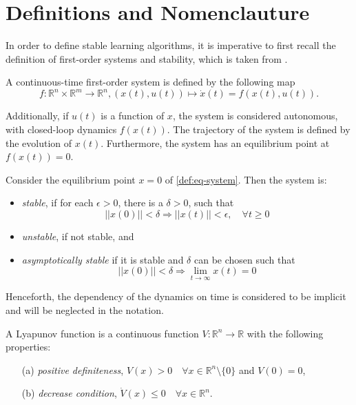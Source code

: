 \section{Definitions and Nomenclauture}
\label{sec:definitions}

In order to define stable learning algorithms, it is imperative to first recall the definition of first-order systems and stability, which is taken from \cite{khalil_nonlinear_2002}.

\begin{definition}[System]
    A continuous-time first-order system is defined by the following map
       \begin{equation}
       f:\mathbb{R}^n\times\mathbb{R}^m\rightarrow \mathbb{R}^n, (x(t),u(t)) \mapsto \dot x(t) = f(x(t),u(t)).
       \label{def:eq-system}
       \end{equation}
   
       Additionally, if $u(t)$ is a function of $x$, the system is considered autonomous, with closed-loop dynamics $f(x(t))$. The trajectory of the system is defined by the evolution of $x(t)$. Furthermore, the system has an equilibrium point at $f(x(t))=0$.
       \label{def:system}
   \end{definition}
   
   \begin{definition}[Stability]
    Consider the equilibrium point $x=0$ of \eqref{def:eq-system}. Then the system is:
    \begin{itemize}
    \item \textit{stable}, if for each $\epsilon>0$, there is a $\delta>0$, such that
        $$||x(0)||<\delta \Rightarrow ||x(t)||<\epsilon, \quad \forall t \geq 0$$ 
    \item \textit{unstable}, if not stable, and
    \item \textit{asymptotically stable} if it is stable and $\delta$ can be chosen such that
        $$||x(0)||<\delta \Rightarrow \lim_{t\rightarrow\infty} x(t)=0 $$
    \end{itemize} 
   \end{definition}
   Henceforth, the dependency of the dynamics on time is considered to be implicit and will be neglected in the notation.
   
   
   \begin{definition}
    A Lyapunov function is a continuous function $V: \mathbb{R}^n\rightarrow\mathbb{R}$ with the following properties:
    \begin{enumerate}
     \item[(a)] \textit{positive definiteness}, $V(x)>0 \quad \forall x\in\mathbb{R}^n\setminus\{0\}$ and $V(0)=0$,
     \item[(b)] \textit{decrease condition}, $\dot V(x)\leq0 \quad \forall x\in\mathbb{R}^n$.
    \end{enumerate}
    \label{def:lyapunov-function}
   \end{definition}
   
